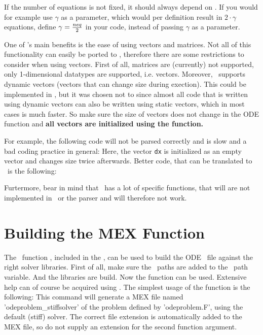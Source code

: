 If the number of equations is not fixed, it should always depend on . If you would for example use $\gamma$ as a parameter, which would per definition result in $2\cdot\gamma$ equations, define $\gamma = {neq \over 2}$ in your code, instead of passing $\gamma$ as a parameter.

One of \MATLAB's main benefits is the ease of using vectors and matrices. Not all of this functionality can easily be ported to \Fortran, therefore there are some restrictions to consider when using vectors. First of all, matrices are (currently) not supported, only 1-dimensional datatypes are supported, i.e. vectors. Moreover, \MATLAB~supports dynamic vectors (vectors that can change size during exection). This could be implemented in \Fortran, but it was chosen not to since almost all code that is written using dynamic vectors can also be written using static vectors, which in most cases is much faster. So make sure the size of vectors does not change in the ODE function and \textbf{all vectors are initialized using the  function.}

For example, the following code will not be parsed correctly and is slow and a bad coding practice in general:
Here, the vector \texttt{dx} is initialized as an empty vector and changes size twice afterwards. Better code, that can be translated to \Fortran~is the following:

Furtermore, bear in mind that \MATLAB~has a lot of specific functions, that will are not implemented in \Fortran~or the parser and will therefore not work.

\section[Building]{Building the MEX Function}
The \MATLAB~function , included in the \PPODESUITE, can be used to build the ODE \Fortran~file against the right solver libraries. First of all, make sure the \PPODESUITE~paths are added to the \MATLAB~path variable.
And the libraries are build.
Now the function  can be used. Extensive help can of course be acquired using . The simplest usage of the function is the following:
This command will generate a MEX file named 'odeproblem\_stiffsolver' of the problem defined by 'odeproblem.F', using the default (stiff) solver. The correct file extension is automatically added to the MEX file, so do not supply an extension for the second function argument.

